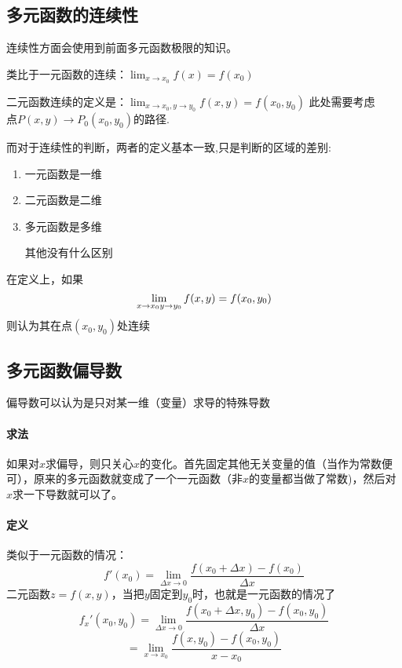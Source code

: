 \documentclass[a4paper]{ctexart}
\begin{document}
\begin{multicols}{2}
\subsection{多元函数的连续性}
\par 连续性方面会使用到前面多元函数极限的知识。 
\par 类比于一元函数的连续：$\lim_{x\rightarrow x_0}{f(x)}=f(x_0)$ 
\par 二元函数连续的定义是：$\lim_{x\rightarrow x_0, y\rightarrow y_0}{f(x,y)}=f(x_0, y_0)$
此处需要考虑$点P(x,y) \rightarrow P_0(x_0, y_0)$的路径.

而对于连续性的判断，两者的定义基本一致,只是判断的区域的差别:
\begin{enumerate}
    \item 一元函数是一维
    \item 二元函数是二维
    \item 多元函数是多维
\par 其他没有什么区别
\end{enumerate}
在定义上，如果
$$\lim_{x\rightarrow x_0\\ y\rightarrow y_0}{f(x,y) = f(x_0, y_0)}$$
则认为其在点$(x_0, y_0)$处连续


\subsection{多元函数偏导数}
\par
偏导数可以认为是只对某一维（变量）求导的特殊导数
\par
\textbf{\color{red}{底下你只需要明白偏导数的定义，和偏导数的求法就可以了}}
\paragraph{求法}
如果对$x$求偏导，则只关心$x$的变化。首先固定其他无关变量的值（当作为常数便可），原来的多元函数就变成了一个一元函数（非$x$的变量都当做了常数)，然后对$x$求一下导数就可以了。
\paragraph{定义}
类似于一元函数的情况：
$$
f'(x_0) = \lim_{\Delta x \rightarrow 0}{\frac{f(x_0 + \Delta x) - f(x_0)}
{
    \Delta x
}}
$$
二元函数$z = f(x, y)$，当把$y$固定到$y_0$时，也就是一元函数的情况了
$$
f_{x}'(x_0,y_0) =\lim_{\Delta x\rightarrow 0}{ \frac{f(x_0 + \Delta x,y_0) - f(x_0, y_0)}
{
    \Delta x
}} 
$$
$$
= \lim_{x\rightarrow x_0}{
    \frac{
        f(x,y_0) - f(x_0, y_0)
    }
    {x - x_0}
}
$$


\end{multicols}
\end{document}
